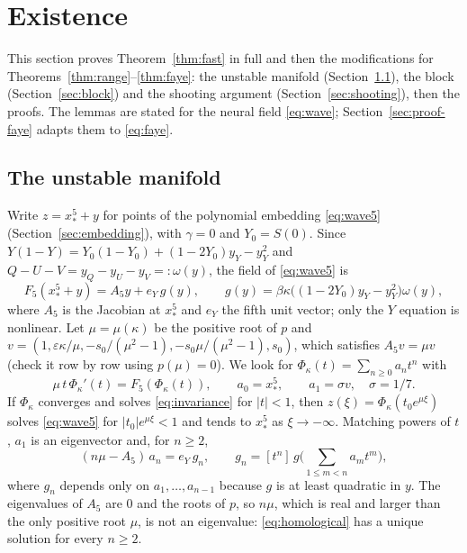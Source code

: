 \documentclass[11pt]{article}
\theoremstyle{definition}
\newcommand{\eps}{\varepsilon}
\newcommand{\xs}{x_*}
\begin{document}
\section{Existence}\label{sec:existence}

This section proves Theorem~\ref{thm:fast} in full and then the modifications for Theorems~\ref{thm:range}--\ref{thm:faye}: the unstable manifold (Section~\ref{sec:manifold}), the block (Section~\ref{sec:block}) and the shooting argument (Section~\ref{sec:shooting}), then the proofs. The lemmas are stated for the neural field \eqref{eq:wave}; Section~\ref{sec:proof-faye} adapts them to \eqref{eq:faye}.

\subsection{The unstable manifold}\label{sec:manifold}

Write $z = \xs^5 + y$ for points of the polynomial embedding \eqref{eq:wave5} (Section~\ref{sec:embedding}), with $\gamma = 0$ and $Y_0 = S(0)$. Since $Y(1 - Y) = Y_0(1 - Y_0) + (1 - 2Y_0)y_Y - y_Y^2$ and $Q - U - V = y_Q - y_U - y_V =: \omega(y)$, the field of \eqref{eq:wave5} is
\begin{equation}\label{eq:F5}
  F_5(\xs^5 + y) = A_5 y + e_Y\, g(y), \qquad g(y) = \beta\kappa\bigl((1 - 2Y_0) y_Y - y_Y^2\bigr)\omega(y),
\end{equation}
where $A_5$ is the Jacobian at $\xs^5$ and $e_Y$ the fifth unit vector; only the $Y$ equation is nonlinear. Let $\mu = \mu(\kappa)$ be the positive root of $p$ and $v = (1, \eps\kappa/\mu, -s_0/(\mu^2 - 1), -s_0\mu/(\mu^2 - 1), s_0)$, which satisfies $A_5 v = \mu v$ (check it row by row using $p(\mu) = 0$). We look for $\Phi_\kappa(t) = \sum_{n \ge 0} a_n t^n$ with
\begin{equation}\label{eq:invariance}
  \mu\, t\, \Phi_\kappa'(t) = F_5(\Phi_\kappa(t)), \qquad a_0 = \xs^5, \qquad a_1 = \sigma v, \quad \sigma = 1/7 .
\end{equation}
If $\Phi_\kappa$ converges and solves \eqref{eq:invariance} for $|t| < 1$, then $z(\xi) = \Phi_\kappa(t_0 e^{\mu\xi})$ solves \eqref{eq:wave5} for $|t_0| e^{\mu\xi} < 1$ and tends to $\xs^5$ as $\xi \to -\infty$. Matching powers of $t$, $a_1$ is an eigenvector and, for $n \ge 2$,
\begin{equation}\label{eq:homological}
  (n\mu - A_5)\, a_n = e_Y\, g_n, \qquad g_n = [t^n]\, g\bigl(\textstyle\sum_{1 \le m < n} a_m t^m\bigr),
\end{equation}
where $g_n$ depends only on $a_1, \dots, a_{n-1}$ because $g$ is at least quadratic in $y$. The eigenvalues of $A_5$ are $0$ and the roots of $p$, so $n\mu$, which is real and larger than the only positive root $\mu$, is not an eigenvalue: \eqref{eq:homological} has a unique solution for every $n \ge 2$.
\end{document}
